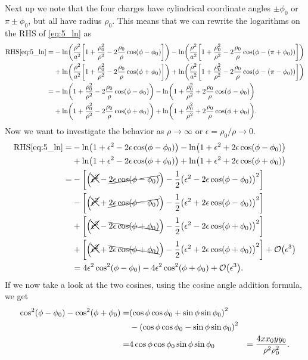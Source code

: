 \documentclass[11pt,letter, swedish, english
]{article}
\begin{document}
Next up we note that the four charges have cylindrical coordinate
angles $\pm\phi_0$ or $\pi\pm\phi_0$, but all have radius $\rho_0$.
This means that we can rewrite the logarithms on the RHS of
\eqref{eq:5_ln} as
\begin{equation}
\begin{aligned}
\text{RHS\eqref{eq:5_ln}}=&
-\ln(\frac{\rho^2}{a^2}
  \qty[1+\frac{\rho_0^2}{\rho^2}-2\frac{\rho_0}{\rho}\cos(\phi-\phi_0)])
-\ln(\frac{\rho^2}{a^2}
  \qty[1+\frac{\rho_0^2}{\rho^2}-2\frac{\rho_0}{\rho}\cos(\phi-(\pi+\phi_0))])\\
&+\ln(\frac{\rho^2}{a^2}
  \qty[1+\frac{\rho_0^2}{\rho^2}-2\frac{\rho_0}{\rho}\cos(\phi+\phi_0)])
+\ln(\frac{\rho^2}{a^2}
  \qty[1+\frac{\rho_0^2}{\rho^2}-2\frac{\rho_0}{\rho}\cos(\phi-(\pi-\phi_0))])\\
=&
-\ln(1+\frac{\rho_0^2}{\rho^2}-2\frac{\rho_0}{\rho}\cos(\phi-\phi_0))
-\ln(1+\frac{\rho_0^2}{\rho^2}+2\frac{\rho_0}{\rho}\cos(\phi-\phi_0))\\
&+\ln(1+\frac{\rho_0^2}{\rho^2}-2\frac{\rho_0}{\rho}\cos(\phi+\phi_0))
+\ln(1+\frac{\rho_0^2}{\rho^2}+2\frac{\rho_0}{\rho}\cos(\phi+\phi_0)).
\end{aligned}
\end{equation}
Now we want to investigate the behavior as $\rho\to\infty$ or
$\epsilon=\rho_0/\rho\to0$. 
\begin{equation}
\begin{aligned}
\text{RHS\eqref{eq:5_ln}}=&
-\ln(1+\epsilon^2-2\epsilon\cos(\phi-\phi_0))
-\ln(1+\epsilon^2+2\epsilon\cos(\phi-\phi_0))\\
&+\ln(1+\epsilon^2-2\epsilon\cos(\phi+\phi_0))
+\ln(1+\epsilon^2+2\epsilon\cos(\phi+\phi_0))\\
=&-\qty[\qty(\xcancel{\epsilon^2}-\cancel{2\epsilon\cos(\phi-\phi_0)})
-\frac{1}{2}\qty(\epsilon^2-2\epsilon\cos(\phi-\phi_0))^2]\\
&-\qty[\qty(\xcancel{\epsilon^2}+\cancel{2\epsilon\cos(\phi-\phi_0)})
-\frac{1}{2}\qty(\epsilon^2+2\epsilon\cos(\phi-\phi_0))^2]\\
&+\qty[\qty(\xcancel{\epsilon^2}-\bcancel{2\epsilon\cos(\phi+\phi_0)})
-\frac{1}{2}\qty(\epsilon^2-2\epsilon\cos(\phi+\phi_0))^2]\\
&+\qty[\qty(\xcancel{\epsilon^2}+\bcancel{2\epsilon\cos(\phi+\phi_0)})
-\frac{1}{2}\qty(\epsilon^2+2\epsilon\cos(\phi+\phi_0))^2]
+\order{\epsilon^3}\\
&=4\epsilon^2\cos^2(\phi-\phi_0)-4\epsilon^2\cos^2(\phi+\phi_0)
+\order{\epsilon^3}.
\end{aligned}
\end{equation}
If we now take a look at the two cosines, using the cosine angle
addition formula, we get 
\begin{equation}
\begin{aligned}
\cos^2(\phi-\phi_0)-\cos^2(\phi+\phi_0)=&
\qty(\cos\phi\cos\phi_0+\sin\phi\sin\phi_0)^2\\
&-\qty(\cos\phi\cos\phi_0-\sin\phi\sin\phi_0)^2\\
=&4\cos\phi\cos\phi_0\sin\phi\sin\phi_0
&=\frac{4xx_0yy_0}{\rho^2\rho_0^2}.
\end{aligned}
\end{equation}
\end{document}
